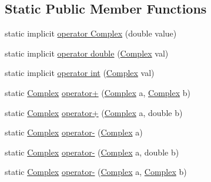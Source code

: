 \subsection*{Static Public Member Functions}
\begin{DoxyCompactItemize}
\item 
static implicit \hyperlink{struct_solar_liner_1_1_complex_number_1_1_complex_a3233893354641096afaf56b505cd94bc}{operator Complex} (double value)
\item 
static implicit \hyperlink{struct_solar_liner_1_1_complex_number_1_1_complex_a0b7239f1559e0156ade91dfa90487d8f}{operator double} (\hyperlink{struct_solar_liner_1_1_complex_number_1_1_complex}{Complex} val)
\item 
static implicit \hyperlink{struct_solar_liner_1_1_complex_number_1_1_complex_ac9a270e2f15e5a2eab990ce4987dd551}{operator int} (\hyperlink{struct_solar_liner_1_1_complex_number_1_1_complex}{Complex} val)
\item 
static \hyperlink{struct_solar_liner_1_1_complex_number_1_1_complex}{Complex} \hyperlink{struct_solar_liner_1_1_complex_number_1_1_complex_aec7e32372bc7c963f0eb72f0c71b5ae2}{operator+} (\hyperlink{struct_solar_liner_1_1_complex_number_1_1_complex}{Complex} a, \hyperlink{struct_solar_liner_1_1_complex_number_1_1_complex}{Complex} b)
\item 
static \hyperlink{struct_solar_liner_1_1_complex_number_1_1_complex}{Complex} \hyperlink{struct_solar_liner_1_1_complex_number_1_1_complex_a7aca3c22ecd22962feac217688ff964a}{operator+} (\hyperlink{struct_solar_liner_1_1_complex_number_1_1_complex}{Complex} a, double b)
\item 
static \hyperlink{struct_solar_liner_1_1_complex_number_1_1_complex}{Complex} \hyperlink{struct_solar_liner_1_1_complex_number_1_1_complex_aa0e735d465627ccb7280a42d79b23874}{operator-\/} (\hyperlink{struct_solar_liner_1_1_complex_number_1_1_complex}{Complex} a)
\item 
static \hyperlink{struct_solar_liner_1_1_complex_number_1_1_complex}{Complex} \hyperlink{struct_solar_liner_1_1_complex_number_1_1_complex_a37f65c6d6b97e364d5db0bb9b0e2770b}{operator-\/} (\hyperlink{struct_solar_liner_1_1_complex_number_1_1_complex}{Complex} a, double b)
\item 
static \hyperlink{struct_solar_liner_1_1_complex_number_1_1_complex}{Complex} \hyperlink{struct_solar_liner_1_1_complex_number_1_1_complex_a21a100bf42dfc7ce28eb8c852219dd26}{operator-\/} (\hyperlink{struct_solar_liner_1_1_complex_number_1_1_complex}{Complex} a, \hyperlink{struct_solar_liner_1_1_complex_number_1_1_complex}{Complex} b)

\end{DoxyCompactItemize}
